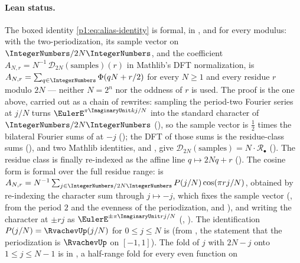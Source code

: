 \documentclass[11pt,oneside]{article}
\theoremstyle{definition}
\theoremstyle{remark}
\newcommand{\PhiU}{\Phi}
\begin{document}
\paragraph{Lean status.}
The boxed identity \eqref{p1:eq:alias-identity} is formal, in
, and for every modulus: with
 the two-periodization,  its sample
vector on \(\IntegerNumbers/2N\IntegerNumbers\), and 
the coefficient \(A_{N,r}=N^{-1}\,\mathcal D_{2N}(\text{samples})(r)\) in Mathlib's DFT
normalization,  is
\(A_{N,r}=\sum_{q\in\IntegerNumbers}\PhiU(qN+r/2)\) for every \(N\ge1\) and every residue
\(r\) modulo \(2N\) --- neither \(N=2^n\) nor the oddness of \(r\) is used.  The proof is
the one above, carried out as a chain of rewrites: sampling the period-two Fourier series
 at \(j/N\) turns \(\EulerE^{\pi\ImaginaryUnit
kj/N}\) into the standard character of \(\IntegerNumbers/2N\IntegerNumbers\)
(), so the sample vector is \(\tfrac12\) times
the bilateral Fourier sums of  at \(-j\)
(); the DFT of those sums is the residue-class sums
(), and two Mathlib identities, 
and , give \(\mathcal D_{2N}(\text{samples})=N\cdot\mathcal R_\bullet\)
().  The residue class is finally re-indexed as the affine
line \(q\mapsto2Nq+r\) ().  The cosine form is formal
over the full residue range:  is
\(A_{N,r}=N^{-1}\sum_{j\in\IntegerNumbers/2N\IntegerNumbers}P(j/N)\cos(\pi rj/N)\), obtained
by re-indexing the character sum through \(j\mapsto-j\), which fixes the sample vector
(, from the period \(2\) and the evenness of the periodization,
 and ), and writing the
character at \(\pm rj\) as \(\EulerE^{\pm\pi\ImaginaryUnit rj/N}\)
(, ).  The
identification \(P(j/N)=\RvachevUp(j/N)\) for \(0\le j\le N\) is
 (from , the
statement that the periodization is \(\RvachevUp\) on \([-1,1]\)).  The fold of \(j\)
with \(2N-j\) onto \(1\le j\le N-1\) is  in
, a half-range fold for every even function on
\end{document}
